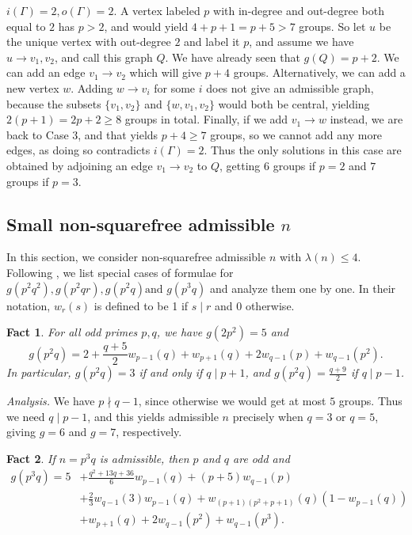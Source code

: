 \documentclass{article}
\theoremstyle{plain}
\newtheorem{eufact}{Fact}[section]
\theoremstyle{definition}
\begin{document}
 $i(\Gamma) = 2, o(\Gamma) = 2$. A vertex labeled $p$ with in-degree and out-degree both equal to $2$ has $p > 2$, and would yield $4 + p + 1 = p + 5 > 7$ groups. So let $u$ be the unique vertex with out-degree $2$ and label it $p$, and assume we have $u \rightarrow v_1, v_2$, and call this graph $Q$. We have already seen that $g(Q) = p + 2$.
We can add an edge $v_1 \rightarrow v_2$ which will give $p + 4$ groups. Alternatively, we can add a new vertex $w$. Adding $w \rightarrow v_i$ for some $i$ does not give an admissible graph, because the subsets $\{v_1, v_2\}$ and $\{w, v_1, v_2\}$ would both be central, yielding $2(p + 1) = 2p + 2 \ge 8$ groups in total. Finally, if we add $v_1 \rightarrow w$ instead, we are back to Case $3$, and that yields $p + 4 \ge 7$ groups, so we cannot add any more edges, as doing so contradicts $i(\Gamma) = 2$. Thus the only solutions in this case are obtained by adjoining an edge $v_1 \rightarrow v_2$ to $Q$, getting $6$ groups if $p = 2$ and $7$ groups if $p = 3$.

\subsection{Small non-squarefree admissible $n$}
In this section, we consider non-squarefree admissible $n$ with $\lambda(n) \le 4$. Following {\cite{bettinafour1}}, we list special cases of formulae for $g(p^2 q^2), g(p^2 q r), g(p^2 q) \text{and } g(p^3 q)$ and analyze them one by one. In their notation, $w_r(s)$ is defined to be 1 if $s \mid r$ and 0 otherwise. 

\begin{eufact}
	For all odd primes $p, q$, we have $g(2p^2) = 5$ and \[g(p^2 q) = 2 + \frac{q + 5}{2} w_{p - 1}(q) + w_{p + 1}(q) + 2w_{q - 1}(p) + w_{q - 1}(p^2).\] In particular, $g(p^2 q) = 3$ if and only if $q \mid p + 1$, and $g(p^2 q) = \frac{q + 9}{2}$ if $q \mid p - 1$.
\end{eufact}

\textit{Analysis.} We have $p \nmid q - 1$, since otherwise we would get at most $5$ groups. Thus we need $q \mid p - 1$, and this yields admissible $n$ precisely when $q = 3$ or $q = 5$, giving $g = 6$ and $g = 7$, respectively.

\begin{eufact}
	If $n = p^3 q$ is admissible, then $p$ and $q$ are odd and
	$$\begin{aligned}
		g(p^3 q) = 5 &+ \frac{q^2 + 13q + 36}{6} w_{p - 1}(q) + (p + 5) w_{q - 1}(p) \\
		&+ \frac{2}{3} w_{q - 1}(3)w_{p - 1}(q) + w_{(p + 1)(p^2 + p + 1)}(q) (1 - w_{p - 1}(q)) \\
		&+ w_{p + 1}(q) + 2 w_{q - 1}(p^2) + w_{q - 1}(p^3).
	\end{aligned}$$
\end{eufact}
\end{document}
